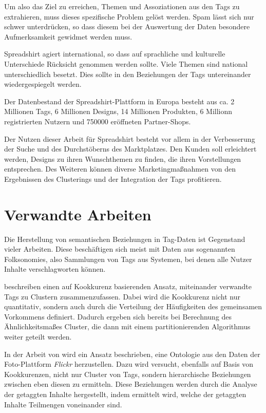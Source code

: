 Um also das Ziel zu erreichen, Themen und Assoziationen aus den Tags zu extrahieren, muss dieses spezifische Problem gelöst werden. Spam lässt sich nur schwer unterdrücken, so dass diesem bei der Auswertung der Daten besondere Aufmerksamkeit gewidmet werden muss.

Spreadshirt agiert international, so dass auf sprachliche und kulturelle Unterschiede Rücksicht genommen werden sollte. Viele Themen sind national unterschiedlich besetzt. Dies sollte in den Beziehungen der Tags untereinander wiedergespiegelt werden.

Der Datenbestand der Spreadshirt-Plattform in Europa besteht aus ca. 2 Millionen Tags, 6 Millionen Designs, 14 Millionen Produkten, 6 Millionn registrierten Nutzern und 750000 eröffneten Partner-Shops.

Der Nutzen dieser Arbeit für Spreadshirt besteht vor allem in der Verbesserung der Suche und des Durchstöberns des Marktplatzes. Den Kunden soll erleichtert werden, Designs zu ihren Wunschthemen zu finden, die ihren Vorstellungen entsprechen. Des Weiteren können diverse Marketingmaßnahmen von den Ergebnissen des Clusterings und der Integration der Tags profitieren.

\section{Verwandte Arbeiten}

Die Herstellung von semantischen Beziehungen in Tag-Daten ist Gegenstand vieler Arbeiten. Diese beschäftigen sich meist mit Daten aus sogenannten Folksonomies, also Sammlungen von Tags aus Systemen, bei denen alle Nutzer Inhalte verschlagworten können.

\textcite{bks2006} beschreiben einen auf Kookkurenz basierenden Ansatz, miteinander verwandte Tags zu Clustern zusammenzufassen. Dabei wird die Kookkurenz nicht nur quantitativ, sondern auch durch die Verteilung der Häufigkeiten des gemeinsamen Vorkommens definiert. Dadurch ergeben sich bereits bei Berechnung des Ähnlichkeitsmaßes Cluster, die dann mit einem partitionierenden Algorithmus weiter geteilt werden.

In der Arbeit von \textcite{ps2006} wird ein Ansatz beschrieben, eine Ontologie aus den Daten der Foto-Plattform \emph{Flickr} herzustellen. Dazu wird versucht, ebenfalls auf Basis von Kookkurenzen, nicht nur Cluster von Tags, sondern hierarchische Beziehungen zwischen eben diesen zu ermitteln. Diese Beziehungen werden durch die Analyse der getaggten Inhalte hergestellt, indem ermittelt wird, welche der getaggten Inhalte Teilmengen voneinander sind.

